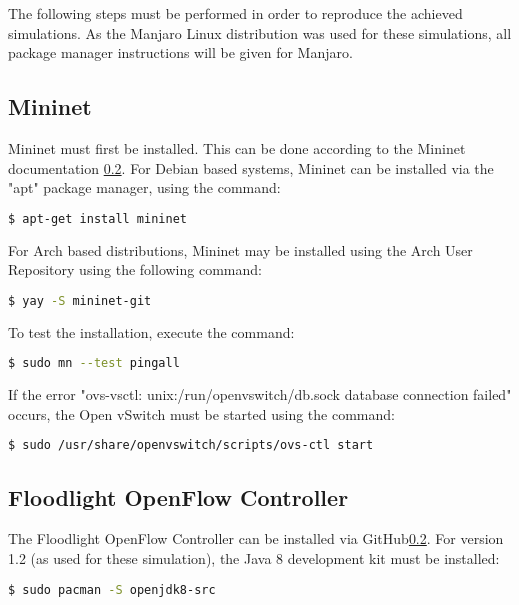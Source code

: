 The following steps must be performed in order to reproduce the achieved
simulations. As the Manjaro Linux distribution was used for these simulations,
all package manager instructions will be given for Manjaro.

\subsection{Mininet}

Mininet must first be installed. This can be done according to the Mininet
documentation \ref{}. For Debian based systems, Mininet can be installed via the
"apt" package manager, using the command:

\begin{lstlisting}[language=bash, caption=Debian-based Distro Mininet Install]
$ apt-get install mininet
\end{lstlisting}

For Arch based distributions, Mininet may be installed using the Arch User
Repository using the following command:

\begin{lstlisting}[language=bash, caption=Arch-based Distro Mininet Install]
$ yay -S mininet-git
\end{lstlisting}

To test the installation, execute the command:

\begin{lstlisting}[language=bash, caption=Mininet installation test]
$ sudo mn --test pingall
\end{lstlisting}

If the error "ovs-vsctl: unix:/run/openvswitch/db.sock database connection
failed" occurs, the Open vSwitch must be started using the command:

\begin{lstlisting}[language=bash, caption=Open vSwitch service start command]
$ sudo /usr/share/openvswitch/scripts/ovs-ctl start
\end{lstlisting}

\subsection{Floodlight OpenFlow Controller}

The Floodlight OpenFlow Controller can be installed via GitHub\ref{}. For
version 1.2 (as used for these simulation), the Java 8 development kit must be
installed:

\begin{lstlisting}[language=bash, caption=openjdk8 installation]
$ sudo pacman -S openjdk8-src
\end{lstlisting}


